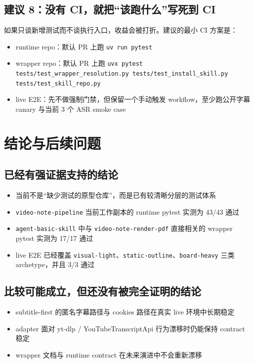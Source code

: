 \documentclass[a4paper]{article}
\begin{document}
\subsection{建议 8：没有 CI，就把“该跑什么”写死到 CI}

如果只谈新增测试而不谈执行入口，收益会被打折。建议的最小 CI 方案是：

\begin{itemize}
\item runtime repo：默认 PR 上跑 \texttt{uv run pytest}
\item wrapper repo：默认 PR 上跑 \texttt{uvx pytest tests/test\_wrapper\_resolution.py tests/test\_install\_skill.py tests/test\_skill\_repo.py}
\item live E2E：先不做强制门禁，但保留一个手动触发 workflow，至少跑公开字幕 canary 与当前 3 个 ASR smoke case
\end{itemize}

\section{结论与后续问题}

\subsection{已经有强证据支持的结论}

\begin{itemize}
\item 当前不是“缺少测试的原型仓库”，而是已有较清晰分层的测试体系
\item \texttt{video-note-pipeline} 当前工作副本的 runtime pytest 实测为 43/43 通过
\item \texttt{agent-basic-skill} 中与 \texttt{video-note-render-pdf} 直接相关的 wrapper pytest 实测为 17/17 通过
\item live E2E 已经覆盖 \texttt{visual-light}、\texttt{static-outline}、\texttt{board-heavy} 三类 archetype，并且 3/3 通过
\end{itemize}

\subsection{比较可能成立，但还没有被完全证明的结论}

\begin{itemize}
\item subtitle-first 的匿名字幕路径与 cookies 路径在真实 live 环境中长期稳定
\item adapter 面对 yt-dlp / YouTubeTranscriptApi 行为漂移时仍能保持 contract 稳定
\item wrapper 文档与 runtime contract 在未来演进中不会重新漂移
\end{itemize}
\end{document}
